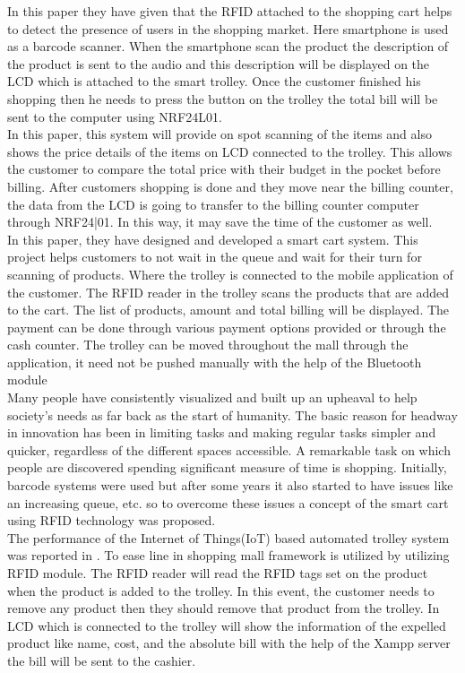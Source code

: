 \documentclass[conference]{IEEEtran}
\begin{document}
In this paper\cite{b6} they have given that the RFID attached to the
shopping cart helps to detect the presence of users in the shopping market.
Here smartphone is used as a barcode scanner. When the smartphone scan the
product the description of the product is sent to the audio and this description
will be displayed on the LCD which is attached to the smart trolley. Once the
customer finished his shopping then he needs to press the button on the trolley
the total bill will be sent to the computer using NRF24L01.\\

In this paper\cite{b7}, this system will provide on spot scanning of the items and also shows the price details of the items on LCD connected to the trolley. This allows the customer to compare the total price with their 
budget in the pocket before billing. After customers shopping is done and they move near the billing counter, the data from the LCD is going to transfer to the billing counter computer through NRF24|01. In
this way, it may save the time of the customer as well.\\

In this paper\cite{b8}, they have designed and developed a smart cart system. This project helps customers to not wait in the queue and wait for their turn for scanning of products. Where the trolley is connected 
to the mobile application of the customer. The RFID reader in the trolley scans the products that are added to the cart. The list of products, amount and total billing will be displayed. The payment can be done 
through various payment options provided or through the cash counter. The trolley can be moved throughout the mall through the application, it need not be pushed manually with the help of the Bluetooth module\\

Many people have consistently visualized and built up an upheaval to help society's needs as far back as the start of humanity. The basic reason for headway in innovation has been in limiting tasks and making regular tasks simpler and quicker, regardless of the different spaces accessible. A remarkable task on which people are discovered spending significant measure of time is shopping. Initially, barcode systems were used but after some years it also started to have issues like an increasing queue, etc. so to overcome these issues a concept of the smart cart using RFID technology was proposed.\\

The performance of the Internet of Things(IoT) based automated trolley system was reported in \cite{b9}. To ease line in shopping mall framework is utilized by utilizing RFID module. The RFID reader will read the RFID tags set on the product when the product is added to the trolley. In this event, the customer needs to remove any product then they should remove that product from the trolley. In LCD which is connected to the trolley will show the information of the expelled product like name, cost, and the absolute bill with the help of the Xampp server the bill will be sent to the cashier.\\
\end{document}
